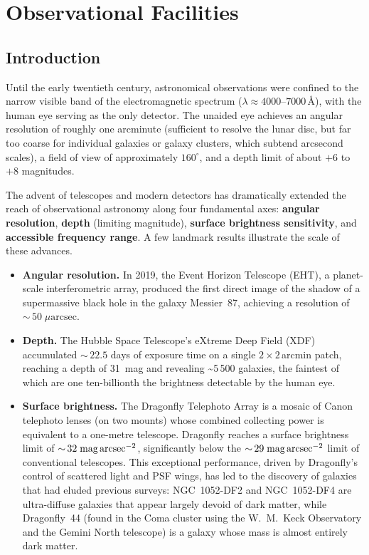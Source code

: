 \chapter{Observational Facilities} \label{ch:observational_facilities}

\section{Introduction}

Until the early twentieth century, astronomical observations were confined to the narrow visible band of the electromagnetic spectrum ($\lambda \approx 4000$--$7000$\,\AA), with the human eye serving as the only detector. The unaided eye achieves an angular resolution of roughly one arcminute (sufficient to resolve the lunar disc, but far too coarse for individual galaxies or galaxy clusters, which subtend arcsecond scales), a field of view of approximately $160^\circ$, and a depth limit of about $+6$ to $+8$ magnitudes.

The advent of telescopes and modern detectors has dramatically extended the reach of observational astronomy along four fundamental axes: \textbf{angular resolution}, \textbf{depth} (limiting magnitude), \textbf{surface brightness sensitivity}, and \textbf{accessible frequency range}. A few landmark results illustrate the scale of these advances.

\begin{itemize}
    \item \textbf{Angular resolution.} In 2019, the Event Horizon Telescope (EHT), a planet-scale interferometric array, produced the first direct image of the shadow of a supermassive black hole in the galaxy Messier~87, achieving a resolution of ${\sim}\,50\;\mu\text{arcsec}$.

    \item \textbf{Depth.} The Hubble Space Telescope's eXtreme Deep Field (XDF) accumulated ${\sim}\,22.5$ days of exposure time on a single $2 \times 2$\,arcmin patch, reaching a depth of 31~mag and revealing \textasciitilde 5\,500 galaxies, the faintest of which are one ten-billionth the brightness detectable by the human eye.

    \item \textbf{Surface brightness.} The Dragonfly Telephoto Array is a mosaic of Canon telephoto lenses (on two mounts) whose combined collecting power is equivalent to a one-metre telescope. Dragonfly reaches a surface brightness limit of ${\sim}\,32\;\text{mag\,arcsec}^{-2}$, significantly below the ${\sim}\,29\;\text{mag\,arcsec}^{-2}$ limit of conventional telescopes. This exceptional performance, driven by Dragonfly's control of scattered light and PSF wings, has led to the discovery of galaxies that had eluded previous surveys: NGC~1052-DF2 and NGC~1052-DF4 are ultra-diffuse galaxies that appear largely devoid of dark matter, while Dragonfly~44 (found in the Coma cluster using the W.\ M.\ Keck Observatory and the Gemini North telescope) is a galaxy whose mass is almost entirely dark matter.
\end{itemize}


